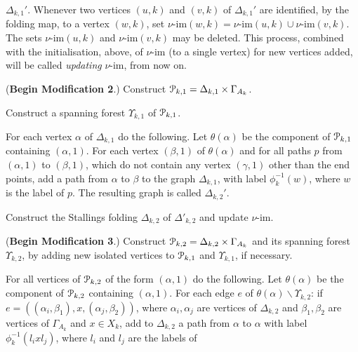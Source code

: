 \documentclass[a4paper,12pt]{article}
\renewcommand{\a}{\alpha }
\renewcommand{\b}{\beta }
\newcommand{\G}{\Gamma }
\newcommand{\g}{\gamma }
\newcommand{\D}{\Delta }
\newcommand{\U}{\Upsilon }
\newcommand{\cP}{{\cal{P}}}
\newcommand{\vim}{\nu\textrm{-im}}
\numberwithin{equation}{section}
\numberwithin{figure}{section}
\newcommand{\bs}{\backslash}
\begin{document}
$\D_{k,1}'$.  
Whenever two vertices $(u,k)$ and $(v,k)$
of $\D_{k,1}'$ are identified, by the folding map, to a vertex $(w,k)$, 
set $\vim(w,k)=\vim(u,k)\cup \vim(v,k)$. 
The sets $\vim(u,k)$ and $\vim(v,k)$ may be deleted.  This process, combined 
with the initialisation, above, of $\vim$ (to a single vertex) for new vertices
added,  will be
called \emph{updating}
$\vim$, from now on. 
\item\label{it:D4} (\textbf{Begin Modification 2}.)
 Construct $\cP_{k,1}=\D_{k,1}\times \G_{A_k}$.
\item\label{it:D5} Construct a spanning forest $\U_{k,1}$ of $\cP_{k,1}$.

\item\label{it:D6} For each vertex $\a$ of $\D_{k,1}$ do the following.
 Let
$\theta(\a)$ be the component of $\cP_{k,1}$ containing $(\a,1)$.
For each vertex $(\b,1)$ of $\theta(\a)$ and for all paths $p$ from
$(\a,1)$ to $(\b,1)$, which do not contain  any vertex $(\g,1)$ other than
the end points, 
 add a path from $\a$ to $\b$ to the graph $\D_{k,1}$, with
label $\phi_k^{-1}(w)$, where $w$ is the label of $p$.
The resulting graph is called $\D_{k,2}'$.
\item\label{it:D7} Construct the Stallings folding $\D_{k,2}$ of $\D'_{k,2}$ and update $\vim$.
\item\label{it:D8} (\textbf{Begin Modification 3}.)
 Construct $\cP_{k,2}=\D_{k,2}\times \G_{A_k}$ and its spanning
 forest $\U_{k,2}$, by adding new isolated vertices to $\cP_{k,1}$ and 
$\U_{k,1}$,
if necessary. 
\item\label{it:D9} For all vertices of $\cP_{k,2}$ of the 
form $(\a,1)$ do the following.
Let $\theta(\a)$ be the component of $\cP_{k,2}$ containing $(\a,1)$.
For each edge $e$ of $\theta(\a)\bs \U_{k,2}$: 
if $e=((\a_i,\b_1),x ,(\a_j,\b_2))$,
where $\a_i,\a_j$ are vertices of $\D_{k,2}$ and $\b_1,\b_2$ are vertices
of $\G_{A_k}$ and $x\in X_k$, add to $\D_{k,2}$ a path from $\a$ to $\a$ with
label $\phi_k^{-1}(l_ixl_j)$, where $l_i$ and $l_j$ are the labels of
\end{document}
